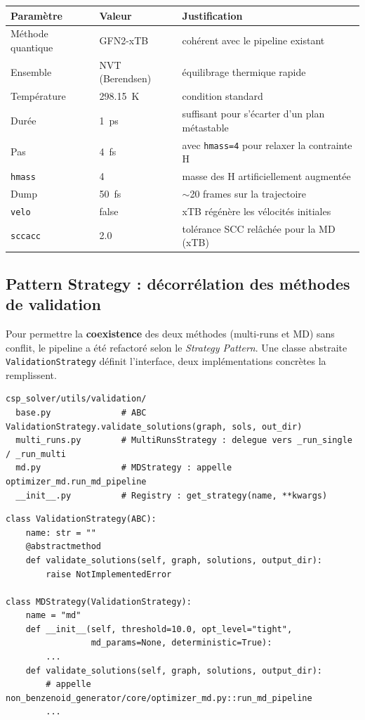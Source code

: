 \begin{center}
\begin{tabular}{lll}
  \toprule
  Paramètre & Valeur & Justification \\
  \midrule
  Méthode quantique & GFN2-xTB    & cohérent avec le pipeline existant \\
  Ensemble          & NVT (Berendsen) & équilibrage thermique rapide \\
  Température       & 298.15~K    & condition standard \\
  Durée             & 1~ps        & suffisant pour s'écarter d'un plan métastable \\
  Pas               & 4~fs        & avec \texttt{hmass=4} pour relaxer la contrainte H \\
  \texttt{hmass}    & 4           & masse des H artificiellement augmentée \\
  Dump              & 50~fs       & $\sim$20 frames sur la trajectoire \\
  \texttt{velo}     & false       & xTB régénère les vélocités initiales \\
  \texttt{sccacc}   & 2.0         & tolérance SCC relâchée pour la MD (xTB) \\
  \bottomrule
\end{tabular}
\end{center}

\subsection{Pattern Strategy : décorrélation des méthodes de validation}

Pour permettre la \textbf{coexistence} des deux méthodes (multi-runs et MD) sans conflit, le
pipeline a été refactoré selon le \emph{Strategy Pattern}. Une classe abstraite
\texttt{ValidationStrategy} définit l'interface, deux implémentations concrètes la remplissent.

\begin{lstlisting}[style=benzai]
csp_solver/utils/validation/
  base.py              # ABC ValidationStrategy.validate_solutions(graph, sols, out_dir)
  multi_runs.py        # MultiRunsStrategy : delegue vers _run_single / _run_multi
  md.py                # MDStrategy : appelle optimizer_md.run_md_pipeline
  __init__.py          # Registry : get_strategy(name, **kwargs)
\end{lstlisting}

\begin{lstlisting}
class ValidationStrategy(ABC):
    name: str = ""
    @abstractmethod
    def validate_solutions(self, graph, solutions, output_dir):
        raise NotImplementedError

class MDStrategy(ValidationStrategy):
    name = "md"
    def __init__(self, threshold=10.0, opt_level="tight",
                 md_params=None, deterministic=True):
        ...
    def validate_solutions(self, graph, solutions, output_dir):
        # appelle non_benzenoid_generator/core/optimizer_md.py::run_md_pipeline
        ...
\end{lstlisting}

